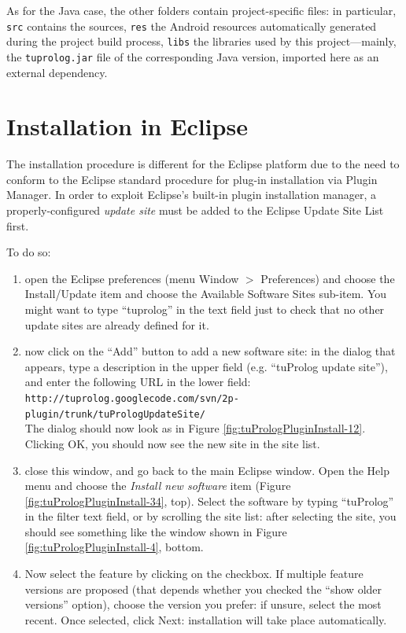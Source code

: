 As for the Java case, the other folders contain project-specific files: in particular, \texttt{src} contains the sources, \texttt{res} the Android resources automatically generated during the project build process, \texttt{libs} the libraries used by this project---mainly, the \texttt{tuprolog.jar} file of the corresponding Java version, imported here as an external dependency.


\section{Installation in Eclipse}

The installation procedure is different for the Eclipse platform due to the need to conform to the Eclipse standard procedure for plug-in installation via Plugin Manager.
%
In order to exploit Eclipse's built-in plugin installation manager, a properly-configured \textit{update site}
must be added to the Eclipse Update Site List first.

To do so:

\begin{enumerate}
  \item open the Eclipse preferences (menu Window $>$ Preferences) and choose the Install/Update item
  and choose the Available Software Sites sub-item. You might want to type ``tuprolog'' in the text field 
  just to check that no other update sites are already defined for it.

  \item now click on the ``Add'' button to add a new software site: in the dialog that appears, type a 
  description in the upper field (e.g. ``tuProlog update site''), and enter the following URL in the lower field:\\
     {\footnotesize{\texttt{http://tuprolog.googlecode.com/svn/2p-plugin/trunk/tuPrologUpdateSite/}}}\\
  The dialog should now look as in Figure \ref{fig:tuPrologPluginInstall-12}.
  Clicking OK, you should now see the new site in the site list.

  \item close this window, and go back to the main Eclipse window. Open the Help menu and choose the 
  \textit{Install new software} item (Figure \ref{fig:tuPrologPluginInstall-34}, top).
  Select the \tuprolog{} software by typing ``tuProlog'' in the filter text field, or by scrolling the site 
  list: after selecting the site, you should see something like the window shown in 
  Figure \ref{fig:tuPrologPluginInstall-4}, bottom.

  \item Now select the \tuprolog{} feature by clicking on the checkbox. If multiple feature versions are 
  proposed (that depends whether you checked the ``show older versions'' option), choose the version you 
  prefer: if unsure, select the most recent.
  Once selected, click Next: installation will take place automatically.
\end{enumerate}

